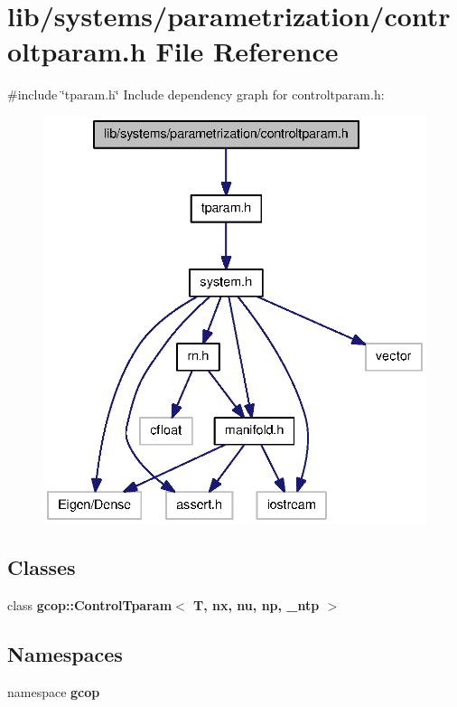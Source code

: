 \section{lib/systems/parametrization/controltparam.h \-File \-Reference}
\label{controltparam_8h}
{\ttfamily \#include \char`\"{}tparam.\-h\char`\"{}}\*
\-Include dependency graph for controltparam.\-h\-:\nopagebreak
\begin{figure}[H]
\begin{center}
\leavevmode
\includegraphics[width=336pt]{controltparam_8h__incl}
\end{center}
\end{figure}
\subsection*{\-Classes}
\begin{DoxyCompactItemize}
\item 
class {\bf gcop\-::\-Control\-Tparam$<$ T, nx, nu, np, \-\_\-ntp $>$}
\end{DoxyCompactItemize}
\subsection*{\-Namespaces}
\begin{DoxyCompactItemize}
\item 
namespace {\bf gcop}
\end{DoxyCompactItemize}
